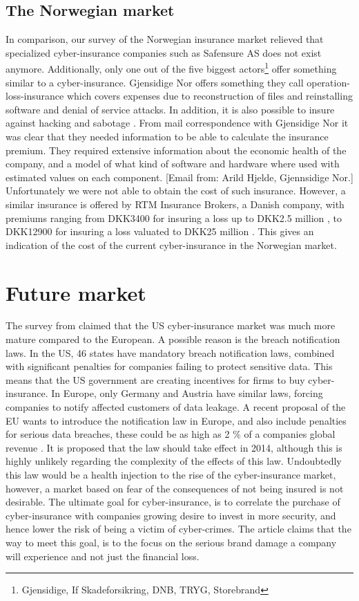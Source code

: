     
\subsection{The Norwegian market}

 In comparison, our survey of the Norwegian insurance market relieved that specialized cyber-insurance companies such as Safensure AS does not exist anymore. Additionally, only one out of the five biggest actors\footnote{Gjensidige, If Skadeforsikring, DNB, TRYG, Storebrand} offer something similar to a cyber-insurance. Gjensidige Nor offers something they call operation-loss-insurance which covers expenses due to reconstruction of files and reinstalling software and denial of service attacks. In addition, it is also possible to insure against hacking and sabotage \citep{gjensidige}. From mail correspondence with Gjensidige Nor it was clear that they needed information to be able to calculate the insurance premium. They required extensive information about the economic health of the company, and a model of what kind of software and hardware where used with estimated values on each component. [Email from: Arild Hjelde, Gjennsidige Nor.] Unfortunately we were not able to obtain the cost of such insurance. However, a similar insurance is offered by RTM Insurance Brokers, a Danish company, with premiums ranging from DKK3400 for insuring a loss up to DKK2.5 million , to DKK12900 for insuring a loss valuated to DKK25 million  \cite{RTM}. This gives an indication of the cost of the current cyber-insurance in the Norwegian market. 
  

\section{Future market}
The survey from \cite{CFCunder} claimed that the US cyber-insurance market was much more mature compared to the European. A possible reason is the breach notification laws. In the US, 46 states have mandatory breach notification laws, combined with significant penalties for companies failing to protect sensitive data. This means that the US government are creating incentives for firms to buy cyber-insurance.
 In Europe, only Germany and Austria have similar laws, forcing companies to notify affected customers of data leakage. A recent proposal of the EU wants to introduce the notification law in Europe, and also include penalties for serious data breaches, these could be as high as 2 $\%$ of a companies global revenue \cite{CFCunder}. It is proposed that the law should take effect in 2014, although this is highly unlikely regarding the complexity of the effects of this law. Undoubtedly this law would be a health injection to the rise of the cyber-insurance market, however, a market based on fear of the consequences of not being insured is not desirable. The ultimate goal for cyber-insurance, is to correlate the purchase of cyber-insurance with companies growing desire to invest in more security, and hence lower the risk of being a victim of cyber-crimes. 
The article claims that the way to meet this goal, is to the focus on the serious brand damage a company will experience and not just the financial loss. 


